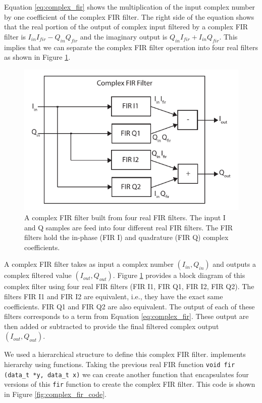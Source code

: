 Equation \ref{eq:complex_fir} shows the multiplication of the input complex number by one coefficient of the complex FIR filter. The right side of the equation shows that the real portion of the output of complex input filtered by a complex FIR filter is $I_{in} I_{fir} - Q_{in}  Q_{fir}$ and the imaginary output is $Q_{in}  I_{fir} + I_{in} Q_{fir}$. This implies that we can separate the complex FIR filter operation into four real filters as shown in Figure \ref{fig:complex_fir}.

\begin{figure}
\centering
\includegraphics[width=6in]{images/complex_fir}
\caption{A complex FIR filter built from four real FIR filters. The input I and Q samples are feed into four different real FIR filters. The FIR filters hold the in-phase (FIR I) and quadrature (FIR Q) complex coefficients. }
\label{fig:complex_fir}
\end{figure}

A complex FIR filter takes as input a complex number $(I_{in},Q_{in})$ and outputs a complex filtered value $(I_{out},Q_{out})$. Figure \ref{fig:complex_fir} provides a block diagram of this complex filter using four real FIR filters (FIR I1, FIR Q1, FIR I2, FIR Q2). The filters FIR I1 and FIR I2 are equivalent, i.e., they have the exact same coefficients. FIR Q1 and FIR Q2 are also equivalent. The output of each of these filters corresponds to a term from Equation \ref{eq:complex_fir}. These output are then added or subtracted to provide the final filtered complex output $(I_{out}, Q_{out})$. 

We used a hierarchical structure to define this complex FIR filter. \VHLS implements hierarchy using functions. Taking the previous real FIR function \lstinline{void fir (data_t *y, data_t x)} we can create another function that encapsulates four versions of this \lstinline{fir} function to create the complex FIR filter. This code is shown in Figure \ref{fig:complex_fir_code}.

